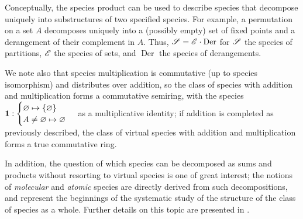 \documentclass[sectionflow,singlespace,twoside,boldmathhdr]{brandiss} %
\numberwithin{section}{chapter}
\numberwithin{figure}{chapter}
\begin{document}
Conceptually, the species product can be used to describe species that decompose uniquely into substructures of two specified species.
For example, a permutation on a set $A$ decomposes uniquely into a (possibly empty) set of fixed points and a derangement of their complement in $A$.
Thus, $\mathscr{S} = \mathscr{E} \cdot \operatorname{Der}$ for $\mathscr{S}$ the species of partitions, $\mathscr{E}$ the species of sets, and $\operatorname{Der}$ the species of derangements.

We note also that species multiplication is commutative (up to species isomorphism) and distributes over addition, so the class of species with addition and multiplication forms a commutative semiring, with the species $\mathbf{1}: \begin{cases} \varnothing \mapsto \left\{ {\varnothing} \right\} \\ A \neq \varnothing \mapsto \varnothing \end{cases}$ as a multiplicative identity; if addition is completed as previously described, the class of virtual species with addition and multiplication forms a true commutative ring.

In addition, the question of which species can be decomposed as sums and products without resorting to virtual species is one of great interest; the notions of \emph{molecular} and \emph{atomic} species are directly derived from such decompositions, and represent the beginnings of the systematic study of the structure of the class of species as a whole.
Further details on this topic are presented in \cite[\S 2.6]{bll:species}.
\end{document}
